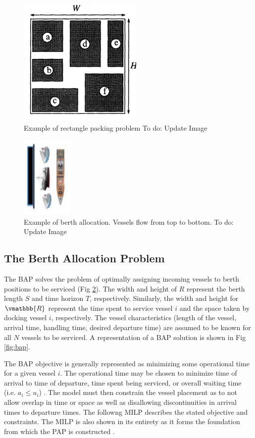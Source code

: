 \documentclass[letterpaper, 10pt, conference]{IEEEtran}
\newcommand{\TODO}[1]{{\color{green} To do: #1}} %
\begin{document}
\begin{figure}
	\centerline{\includegraphics[width=6cm]{chip-pack.png}}
	\caption{Example of rectangle packing problem \TODO{Update Image}}
	\label{fig:packexample}
\end{figure}

\begin{figure}
	\centerline{\includegraphics[height=4cm]{bapexample.png}}
	\caption{Example of berth allocation. Vessels flow from top to bottom.\TODO{Update Image}}
	\label{fig:bapexample}
\end{figure}

\subsection{The Berth Allocation Problem}
The BAP solves the problem of optimally assigning incoming vessels to berth positions to be serviced (Fig \ref{fig:bapexample}). The width and height of \(R\) represent the berth length \(S\) and time horizon \(T\), respectively. Similarly, the width and height for \(\vmathbb{R}\) represent the time spent to service vessel $i$ and the space taken by docking vessel $i$, respectively. The vessel characteristics (length of the vessel, arrival time, handling time, desired departure time) are assumed to be known for all $N$ vessels to be serviced. A representation of a BAP solution is shown in Fig \ref{fig:bap}.

The BAP objective is generally represented as minimizing some operational time for a given vessel \(i\). The operational time may be chosen to minimize time of arrival to time of departure, time spent being serviced, or overall waiting time (i.e. \(a_i \leq u_i\)) \cite{Cheng2007, Buhrkal2010,Frojan2015}. The model must then constrain the vessel placement as to not allow overlap in time or space as well as disallowing discontinuities in arrival times to departure times. The followng MILP describes the stated objective and constraints. The MILP is also shown in its entirety as it forms the foundation from which the PAP is constructed \cite{Qarebagh2019}.
\end{document}
